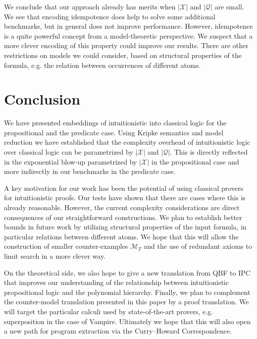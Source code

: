 \documentclass[runningheads]{llncs}
\begin{document}
We conclude that our approach already has merits when $|\mathcal X|$ and $|\mathcal Q|$ are small. 
We see that encoding idempotence does help to solve some additional benchmarks, but in general does not improve performance.
However, idempotence is a quite powerful concept from a model-theoretic perspective. We suspect that a more clever encoding of this property could improve our results. There are other restrictions on models we could consider, based on structural properties of the formula, e.g. the relation between occurrences of different atoms.

\section{Conclusion}

We have presented embeddings of intuitionistic into classical logic for the propositional and the predicate case. Using Kripke semantics and model reduction we have established that the complexity overhead of intuitionistic logic over classical logic can be parametrized by $|\mathcal X|$ and $|\mathcal Q|$. This is directly reflected in the exponential blow-up parametrized by $|\mathcal X|$ in the propositional case and more indirectly in our benchmarks in the predicate case.

A key motivation for our work has been the potential of using classical provers for intuitionistic proofs. Our tests have shown that there are cases where this is already reasonable.
However, the current complexity considerations are direct consequences of our straightforward constructions. We plan to establish better bounds in future work by utilizing structural properties of the input formula, in particular relations between different atoms. We hope that this will allow the construction of smaller counter-examples $\mathcal M_T$ and the use of redundant axioms to limit search in a more clever way.

On the theoretical side, we also hope to give a new translation from QBF to IPC that improves our understanding of the relationship between intuitionistic propositional logic and the polynomial hierarchy.
Finally, we plan to complement the counter-model translation presented in this paper by a proof translation.
We will target the particular calculi used by state-of-the-art provers, e.g. superposition in the case of Vampire. Ultimately we hope that this will also open a new path for program extraction via the Curry--Howard Correspondence.



\end{document}
